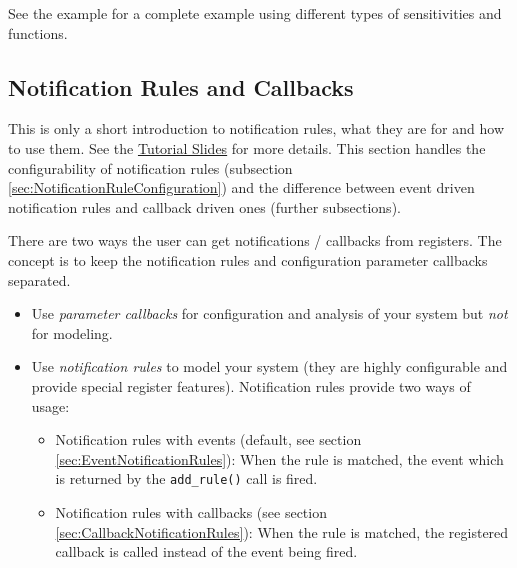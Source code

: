 See the example  for a complete example using different types of sensitivities and functions.

\subsection{Notification Rules and Callbacks}

This is only a short introduction to notification rules, what they are for and how to use them. See the \hyperlink{lnk:TutorialSlides}{Tutorial Slides} for more details. This section handles the configurability of notification rules (subsection \ref{sec:NotificationRuleConfiguration}) and the difference between event driven notification rules and callback driven ones (further subsections).


There are two ways the user can get notifications / callbacks from registers. The concept is to keep the notification rules and configuration parameter callbacks separated.

\begin{itemize}
  \item Use {\em parameter callbacks} for configuration and analysis of your system but {\em not} for modeling.
  \item Use {\em notification rules} to model your system (they are highly configurable and provide special register features). \newline  Notification rules provide two ways of usage:
  \begin{itemize}
    \item Notification rules with events (default, see section \ref{sec:EventNotificationRules}):\newline
     When the rule is matched, the event which is returned by the \lstinline|add_rule()| call is fired. 
    \item Notification rules with callbacks (see section \ref{sec:CallbackNotificationRules}): \newline
     When the rule is matched, the registered callback is called instead of the event being fired. 
  \end{itemize}
\end{itemize}

